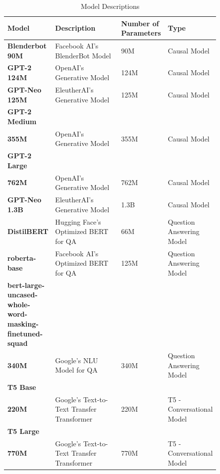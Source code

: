 \documentclass{wseas}
\begin{document}

\begin{table}[htbp]
  \centering
  \caption{Model Descriptions} %
  \label{tab:model_descriptions}  %
  \begin{tabular}{|p{0.2\linewidth}|p{0.35\linewidth}|p{0.15\linewidth}|p{0.15\linewidth}|}
  \hline
  \textbf{Model} & \textbf{Description} & \textbf{Number of Parameters} & \textbf{Type} \\
  \hline
  \textbf{Blenderbot 90M} & Facebook AI's BlenderBot Model & 90M & Causal Model \\
  \hline
  \textbf{GPT-2 124M} & OpenAI's Generative Model & 124M & Causal Model \\
  \hline
  \textbf{GPT-Neo 125M} & EleutherAI's Generative Model & 125M & Causal Model \\
  \hline
  \textbf{GPT-2 Medium} \\ \textbf{355M} & OpenAI's Generative Model & 355M & Causal Model \\
  \hline
  \textbf{GPT-2 Large} \\ \textbf{762M} & OpenAI's Generative Model & 762M & Causal Model \\
  \hline
  \textbf{GPT-Neo 1.3B} & EleutherAI's Generative Model & 1.3B & Causal Model \\
  \hline
  \textbf{DistilBERT} & Hugging Face's Optimized BERT for QA & 66M & Question Answering Model \\
  \hline
  \textbf{roberta-base} & Facebook AI's Optimized BERT for QA & 125M & Question Answering Model \\
  \hline
  \textbf{bert-large-uncased-whole-word-masking-finetuned-squad} \\ \textbf{340M} & Google's NLU Model for QA & 340M & Question Answering Model \\
  \hline
  \textbf{T5 Base} \\ \textbf{220M} & Google's Text-to-Text Transfer Transformer & 220M & T5 - Conversational Model \\
  \hline
  \textbf{T5 Large} \\ \textbf{770M} & Google's Text-to-Text Transfer Transformer & 770M & T5 - Conversational Model \\
  \hline
  \end{tabular}
\end{table}
  
  
  
  
\end{document}
